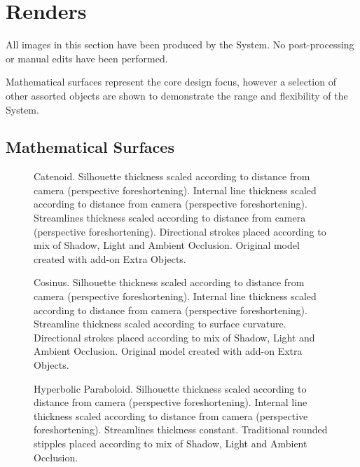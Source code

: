 \chapter{Renders}\label{appendix_renders}

All images in this section have been produced by the System. No post-processing or manual edits have been performed.

Mathematical surfaces represent the core design focus, however a selection of other assorted objects are shown to demonstrate the range and flexibility of the System.

\FloatBarrier
\section{Mathematical Surfaces}

\begin{figure}[h!]
	\centering
	
	\caption{Catenoid. Silhouette thickness scaled according to distance from camera (perspective foreshortening). Internal line thickness scaled according to distance from camera (perspective foreshortening). Streamlines thickness scaled according to distance from camera (perspective foreshortening). Directional strokes placed according to mix of Shadow, Light and Ambient Occlusion. Original model created with add-on Extra Objects.}\label{render_catenoid}
\end{figure}

\begin{figure}[h!]
	\centering
	
	\caption{Cosinus. Silhouette thickness scaled according to distance from camera (perspective foreshortening). Internal line thickness scaled according to distance from camera (perspective foreshortening). Streamline thickness scaled according to surface curvature. Directional strokes placed according to mix of Shadow, Light and Ambient Occlusion. Original model created with add-on Extra Objects.}\label{render_cosinus}
\end{figure}

\begin{figure}[h!]
	\centering
	
	\caption{Hyperbolic Paraboloid. Silhouette thickness scaled according to distance from camera (perspective foreshortening). Internal line thickness scaled according to distance from camera (perspective foreshortening). Streamlines thickness constant. Traditional rounded stipples placed according to mix of Shadow, Light and Ambient Occlusion.}\label{render_hyperbolic_paraboloid}
\end{figure}

